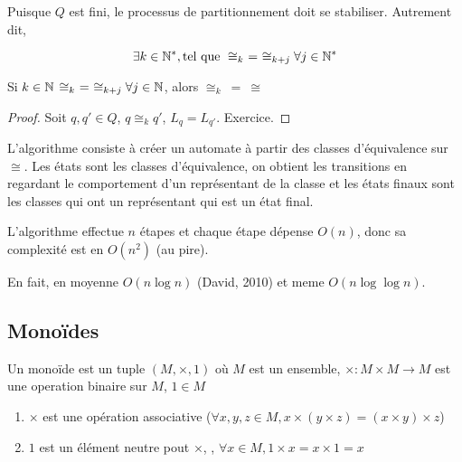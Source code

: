 \begin{remarque}
	Puisque $Q$ est fini, le processus de partitionnement doit se stabiliser. Autrement dit,

	$$\exists k \in \mathbb{N}^*, \text{tel que } \cong_{k} \ = \ \cong_{k+j} \forall j \in \mathbb{N}^* $$
\end{remarque}


\begin{prop}
	Si $k \in \mathbb{N}$ \tq $ \cong_k \ = \ \cong_{k+j} \forall j \in \mathbb{N}$, alors $\cong_k \ = \ \cong$
\end{prop}

\begin{proof}
	Soit $q,q' \in Q$, $q \cong_k q'$, \mq $L_q = L_{q'}$. Exercice.
\end{proof}

\begin{definition}
	L'algorithme consiste à créer un automate à partir des classes d'équivalence sur $\cong$.
	Les états sont les classes d'équivalence, on obtient les transitions en regardant le comportement
	d'un représentant de la classe et les états finaux sont les classes qui ont un représentant qui est un état final.
\end{definition}


\begin{complexite}
	L'algorithme effectue $n$ étapes et chaque étape dépense $O(n)$, donc sa complexité est en $O(n^2)$ (au pire).

	En fait, en moyenne $O(n \log n)$ (David, 2010) et meme $O(n \log \log n)$.
\end{complexite}


\subsection{Monoïdes}

\begin{definition}[Monoïde]
	Un monoïde est un tuple $(M, \times, 1)$ où $M$ est un ensemble, $\times : M \times M \to M$ est une operation binaire sur $M$,
	$1\in M$ \tq
	\begin{enumerate}
		\item $\times$ est une opération  associative ($\forall x,y,z \in M , x \times (y \times z) = (x \times y) \times z$)
		\item $1$ est un élément neutre pout $\times$, \cad, $\forall x \in M, 1 \times x = x \times 1 = x$
	\end{enumerate}
\end{definition}

